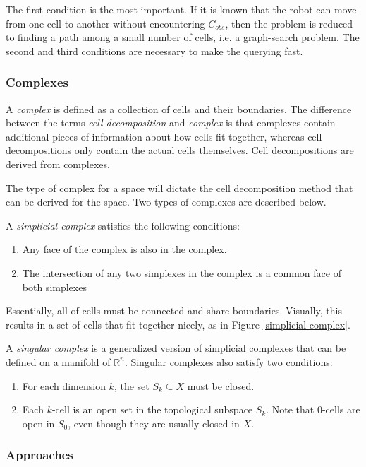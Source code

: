 \documentclass[10pt,conference]{ieeeconf}
\begin{document}
The first condition is the most important. If it is known that the robot can move from one cell to another without encountering $C_{obs}$, then the problem is reduced to finding a path among a small number of cells, i.e. a graph-search problem. The second and third conditions are necessary to make the querying fast.


\subsubsection{Complexes}

A \emph{complex} is defined as a collection of cells and their boundaries. The difference between the terms \emph{cell decomposition} and \emph{complex} is that complexes contain additional pieces of information about how cells fit together, whereas cell decompositions only contain the actual cells themselves. Cell decompositions are derived from complexes.

The type of complex for a space will dictate the cell decomposition method that can be derived for the space. Two types of complexes are described below.

A \emph{simplicial complex} satisfies the following conditions:

\begin{enumerate}
\item Any face of the complex is also in the complex.
\item The intersection of any two simplexes in the complex is a common face of both simplexes
\end{enumerate}

Essentially, all of cells must be connected and share boundaries. Visually, this results in a set of cells that fit together nicely, as in Figure \ref{simplicial-complex}. 

A \emph{singular complex} is a generalized version of simplicial complexes that can be defined on a manifold of $\mathbb{R}^n$. Singular complexes also satisfy two conditions:

\begin{enumerate}
\item For each dimension $k$, the set $S_k \subseteq X$ must be closed. 
\item Each $k$-cell is an open set in the topological subspace $S_k$. Note that 0-cells are open in $S_0$, even though they are usually closed in $X$.
\end{enumerate} 

\subsubsection{Approaches}
\end{document}
